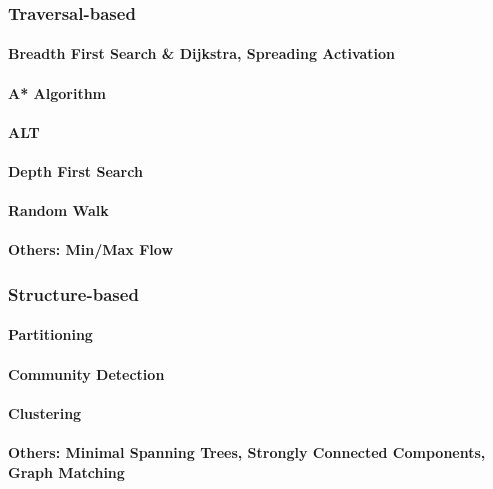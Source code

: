         \subsubsection{Traversal-based}
            \paragraph{Breadth First Search \& Dijkstra, Spreading Activation}
            \paragraph{A* Algorithm}
            \paragraph{ALT}
            \paragraph{Depth First Search}
            \paragraph{Random Walk}
            \paragraph{Others: Min/Max Flow}
        
        \subsubsection{Structure-based}
            \paragraph{Partitioning}
            \paragraph{Community Detection}
            \paragraph{Clustering}
            \paragraph{Others: Minimal Spanning Trees, Strongly Connected Components, Graph Matching}
            
            
